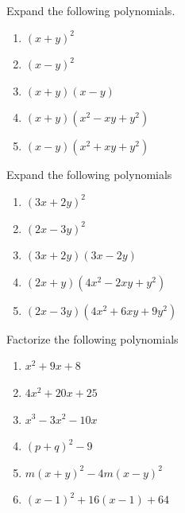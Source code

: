 \documentclass[addpoints, 10pt]{exam}
\begin{document}
\begin{questions}

	\question Expand the following polynomials.
	\begin{multicols}{3}
		\begin{enumerate}[label=(\alph*)]
			\item $(x+y)^2$
			\item $(x-y)^2$
			\item $(x+y)(x-y)$
			\item $(x+y)(x^2-xy+y^2)$
			\item $(x-y)(x^2+xy+y^2)$
		\end{enumerate}
	\end{multicols}

	\question Expand the following polynomials
	\begin{multicols}{3}
		\begin{enumerate}[label=(\alph*)]
			\item $(3x+2y)^2$
			\item $(2x-3y)^2$
			\item $(3x+2y)(3x-2y)$
			\item $(2x+y)(4x^2-2xy+y^2)$
			\item $(2x-3y)(4x^2+6xy+9y^2)$
		\end{enumerate}
	\end{multicols}

	\question Factorize the following polynomials
	\begin{multicols}{3}
		\begin{enumerate}[label=(\alph*)]
			\item $x^2+9x+8$
			\item $4x^2+20x+25$
			\item $x^3-3x^2-10x$ 
			\item $(p+q)^2-9$
			\item $m(x+y)^2-4m(x-y)^2$
			\item $(x-1)^2+16(x-1)+64$
		\end{enumerate}
	\end{multicols}


\end{questions}
\end{document}
